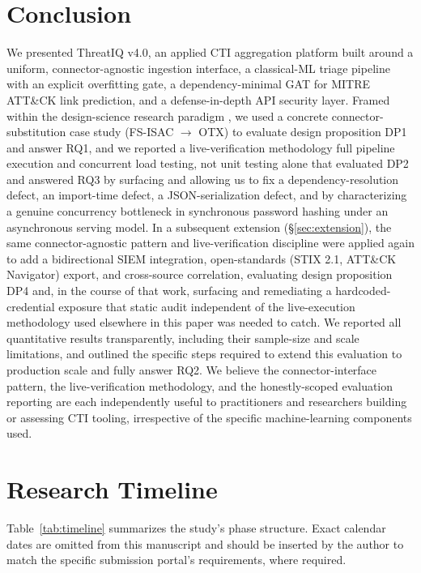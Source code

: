 \documentclass[conference]{IEEEtran}
\begin{document}
\section{Conclusion}
We presented ThreatIQ v4.0, an applied CTI aggregation platform built around a uniform, connector-agnostic ingestion interface, a classical-ML triage pipeline with an explicit overfitting gate, a dependency-minimal GAT for MITRE ATT\&CK link prediction, and a defense-in-depth API security layer. Framed within the design-science research paradigm \cite{hevner2004design}, we used a concrete connector-substitution case study (FS-ISAC $\rightarrow$ OTX) to evaluate design proposition DP1 and answer RQ1, and we reported a live-verification methodology \textemdash{} full pipeline execution and concurrent load testing, not unit testing alone \textemdash{} that evaluated DP2 and answered RQ3 by surfacing and allowing us to fix a dependency-resolution defect, an import-time defect, a JSON-serialization defect, and by characterizing a genuine concurrency bottleneck in synchronous password hashing under an asynchronous serving model. In a subsequent extension (\S\ref{sec:extension}), the same connector-agnostic pattern and live-verification discipline were applied again to add a bidirectional SIEM integration, open-standards (STIX 2.1, ATT\&CK Navigator) export, and cross-source correlation, evaluating design proposition DP4 and, in the course of that work, surfacing and remediating a hardcoded-credential exposure that static audit \textemdash{} independent of the live-execution methodology used elsewhere in this paper \textemdash{} was needed to catch. We reported all quantitative results transparently, including their sample-size and scale limitations, and outlined the specific steps required to extend this evaluation to production scale and fully answer RQ2. We believe the connector-interface pattern, the live-verification methodology, and the honestly-scoped evaluation reporting are each independently useful to practitioners and researchers building or assessing CTI tooling, irrespective of the specific machine-learning components used.

\section{Research Timeline}
\label{sec:timeline}
Table~\ref{tab:timeline} summarizes the study's phase structure. Exact calendar dates are omitted from this manuscript and should be inserted by the author to match the specific submission portal's requirements, where required.
\end{document}
